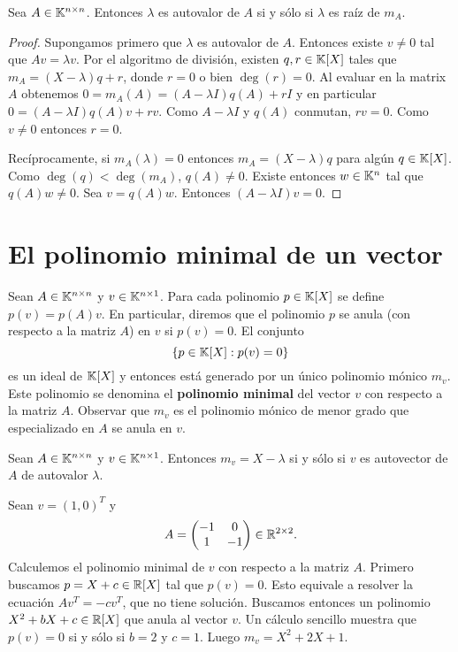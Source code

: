 \begin{prop}
	Sea $A\in\mathbb{K}^{n\times n}$. Entonces $\lambda$ es autovalor de $A$ si y sólo
	si $\lambda$ es raíz de $m_A$.

	\begin{proof}
		Supongamos primero que $\lambda$ es autovalor de $A$. Entonces existe
		$v\ne0$ tal que $Av=\lambda v$. Por el algoritmo de división, existen
		$q,r\in\mathbb{K}[X]$ tales que $m_A=(X-\lambda)q+r$, donde $r=0$ o bien
		$\deg(r)=0$. Al evaluar en la matrix $A$ obtenemos $0=m_A(A)=(A-\lambda
		I)q(A)+rI$ y en particular $0=(A-\lambda I)q(A)v+rv$. Como $A-\lambda
		I$ y $q(A)$ conmutan, $rv=0$. Como $v\ne0$ entonces $r=0$.

		Recíprocamente, si $m_A(\lambda)=0$ entonces $m_A=(X-\lambda)q$ para
		algún $q\in\mathbb{K}[X]$. Como $\deg(q)<\deg(m_A)$, $q(A)\ne0$. Existe
		entonces $w\in\mathbb{K}^n$ tal que $q(A)w\ne0$. Sea $v=q(A)w$. Entonces
		$(A-\lambda I)v=0$.
	\end{proof}
\end{prop}

\section{El polinomio minimal de un vector}

\begin{block}
	Sean $A\in\mathbb{K}^{n\times n}$ y $v\in\mathbb{K}^{n\times1}$. Para cada polinomio
	$p\in\mathbb{K}[X]$ se define $p(v)=p(A)v$. En particular, diremos que el polinomio
	$p$ se anula (con respecto a la matriz $A$) en $v$ si $p(v)=0$.  El
	conjunto 
	\[
		\{p\in\mathbb{K}[X]:p(v)=0\}
	\]
	es un ideal de $\mathbb{K}[X]$ y entonces está generado por un único polinomio
	mónico $m_v$. Este polinomio se denomina el \textbf{polinomio minimal} del
	vector $v$ con respecto a la matriz $A$. Observar que $m_v$ es el polinomio
	mónico de menor grado que especializado en $A$ se anula en $v$.
\end{block}

\begin{example}
	Sean $A\in\mathbb{K}^{n\times n}$ y $v\in\mathbb{K}^{n\times1}$. Entonces $m_v=X-\lambda$ si y sólo si $v$ es
	autovector de $A$ de autovalor $\lambda$. 
\end{example}

\begin{example}
	Sean $v=(1,0)^T$ y 
	\[
		A=\begin{pmatrix}
			-1 & 0\\
			1 & -1
		\end{pmatrix}\in\mathbb{R}^{2\times2}.
	\]
	Calculemos el polinomio minimal de $v$ con respecto a la matriz $A$.
	Primero buscamos $p=X+c\in\mathbb{R}[X]$ tal que $p(v)=0$.  Esto equivale a
	resolver la ecuación $Av^T=-cv^T$, que no tiene solución.  Buscamos
	entonces un polinomio $X^2+bX+c\in\mathbb{R}[X]$ que anula al vector $v$. Un
	cálculo sencillo muestra que $p(v)=0$ si y sólo si $b=2$ y $c=1$.  Luego
	$m_v=X^2+2X+1$. 
\end{example}

